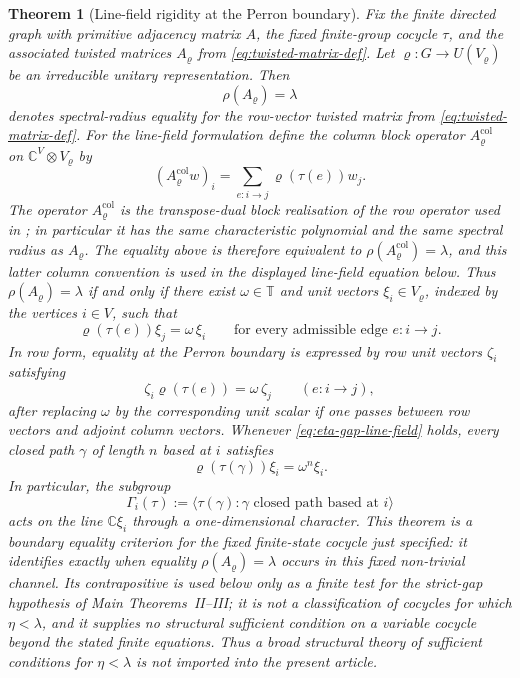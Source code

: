 \documentclass[11pt,a4paper]{amsart}
\theoremstyle{plain}
\newtheorem{theorem}{Theorem}[section]
\theoremstyle{definition}
\theoremstyle{remark}
\newcommand{\CC}{\mathbb{C}}
\newcommand{\TT}{\mathbb{T}}
\begin{document}
\begin{theorem}[Line-field rigidity at the Perron boundary]
  \label{thm:eta-gap-rigidity}
  Fix the finite directed graph with primitive adjacency matrix \(A\), the
  fixed finite-group cocycle \(\tau\), and the associated twisted matrices
  \(A_\varrho\) from \eqref{eq:twisted-matrix-def}.  Let
  \(\varrho:G\to U(V_\varrho)\) be an irreducible unitary representation.
  Then
  \[
    \rho(A_\varrho)=\lambda
  \]
  denotes spectral-radius equality for the row-vector twisted matrix from
  \eqref{eq:twisted-matrix-def}. For the line-field formulation define
  the column block operator \(A_\varrho^{\mathrm{col}}\) on
  \(\CC^V\otimes V_\varrho\) by
  \[
    (A_\varrho^{\mathrm{col}} w)_i
    =
    \sum_{e:i\to j}\varrho(\tau(e))w_j .
  \]
  The operator \(A_\varrho^{\mathrm{col}}\) is the transpose-dual block
  realisation of the row operator used in
  ; in particular it has the same
  characteristic polynomial and the same spectral radius as
  \(A_\varrho\). The equality above is therefore equivalent to
  \(\rho(A_\varrho^{\mathrm{col}})=\lambda\), and this latter column
  convention is used in the displayed line-field equation below.
  Thus \(\rho(A_\varrho)=\lambda\) if and only if there exist
  \(\omega\in\TT\) and unit vectors
  \(\xi_i\in V_\varrho\), indexed by the vertices \(i\in V\), such that
  \begin{equation}\label{eq:eta-gap-line-field}
    \varrho(\tau(e))\xi_j=\omega\,\xi_i
    \qquad
    \text{for every admissible edge } e:i\to j.
  \end{equation}
  In row form, equality at the Perron boundary is expressed by
  row unit vectors \(\zeta_i\) satisfying
  \[
    \zeta_i\varrho(\tau(e))=\omega\,\zeta_j
    \qquad(e:i\to j),
  \]
  after replacing \(\omega\) by the corresponding unit scalar if one
  passes between row vectors and adjoint column vectors.
  Whenever \eqref{eq:eta-gap-line-field} holds, every closed path
  \(\gamma\) of length \(n\) based at \(i\) satisfies
  \begin{equation}\label{eq:eta-gap-loop-character}
    \varrho(\tau(\gamma))\xi_i=\omega^n\xi_i.
  \end{equation}
  In particular, the subgroup
  \[
    \Gamma_i(\tau)
    :=
    \bigl\langle \tau(\gamma):
      \gamma \text{ closed path based at } i
    \bigr\rangle
  \]
  acts on the line \(\CC\xi_i\) through a one-dimensional character.  This
  theorem is a boundary equality criterion for the fixed finite-state cocycle
  just specified: it identifies exactly when equality
  \(\rho(A_\varrho)=\lambda\) occurs in this fixed non-trivial channel.  Its
  contrapositive is used below only as a finite test for the strict-gap
  hypothesis of Main Theorems~II--III; it is not a classification of cocycles
  for which \(\eta<\lambda\), and it supplies no structural sufficient
  condition on a variable cocycle beyond the stated finite equations.  Thus a
  broad structural theory of sufficient conditions for \(\eta<\lambda\) is not
  imported into the present article.
\end{theorem}
\end{document}
